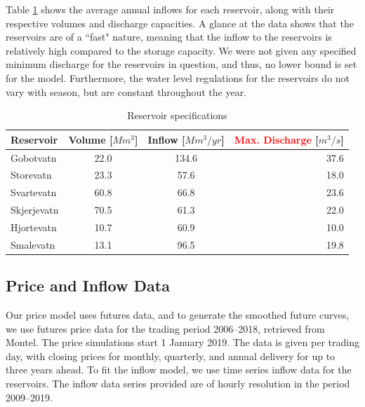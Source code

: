 Table \ref{tab:reservoir_specifications} shows the average annual inflows for each reservoir, along with their respective volumes and discharge capacities. A glance at the data shows that the reservoirs are of a ``fast" nature, meaning that the inflow to the reservoirs is relatively high compared to the storage capacity. We were not given any specified minimum discharge for the reservoirs in question, and thus, no lower bound is set for the model. Furthermore, the water level regulations for the reservoirs do not vary with season, but are constant throughout the year. 

\begin{table}[H]
    \caption{Reservoir specifications}
    \label{tab:reservoir_specifications}
\centering
    \begin{tabular}{ l  c  c  r}
        \toprule
        Reservoir &  Volume [$Mm^3$] & Inflow [$Mm^3/yr$] & \textcolor{red}{Max. Discharge} [$m^3/s$]\\[1mm] \midrule
        Gobotvatn &  22.0 &  134.6 & 37.6\\ 
        Storevatn & 23.3 & 57.6 & 18.0\\ 
        Svartevatn & 60.8 & 66.8 & 23.6\\ 
        Skjerjevatn  & 70.5 & 61.3 & 22.0 \\ 
        Hjortevatn & 10.7 & 60.9 & 10.0 \\ 
        Smalevatn & 13.1 & 96.5 & 19.8 \\ \bottomrule

    \end{tabular}
\end{table}  

\subsection{Price and Inflow Data}
\label{case:price}
Our price model uses futures data, and to generate the smoothed future curves, we use futures price data for the trading period 2006--2018, retrieved from Montel. The price simulations start 1 January 2019. The data is given per trading day, with closing prices for monthly, quarterly, and annual delivery for up to three years ahead. 
To fit the inflow model, we use time series inflow data for the reservoirs. The inflow data series provided are of hourly resolution in the period 2009--2019. 
